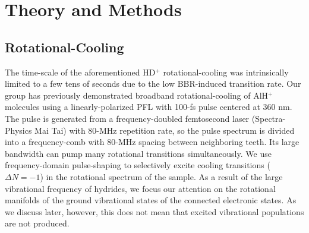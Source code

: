 \documentclass[nofootinbib,aip,jcp,reprint]{revtex4-1}
\begin{document}

\section{Theory and Methods}
\subsection{Rotational-Cooling}

The time-scale of the aforementioned HD$^+$ rotational-cooling was intrinsically limited to a few tens of seconds due to the low BBR-induced transition rate. Our group has previously demonstrated broadband rotational-cooling of AlH$^+$ molecules using a linearly-polarized PFL with 100-fs pulse centered at 360 nm. The pulse is generated from a frequency-doubled femtosecond laser (Spectra-Physics Mai Tai) with 80-MHz repetition rate, so the pulse spectrum is divided into a frequency-comb with 80-MHz spacing between neighboring teeth. Its large bandwidth can pump many rotational transitions simultaneously. We use frequency-domain pulse-shaping to selectively excite cooling transitions ($\Delta N=-1$) in the rotational spectrum of the sample. As a result of the large vibrational frequency of hydrides, we focus our attention on the rotational manifolds of the ground vibrational states of the connected electronic states. As we discuss later, however, this does not mean that excited vibrational populations are not produced.%
\end{document}
